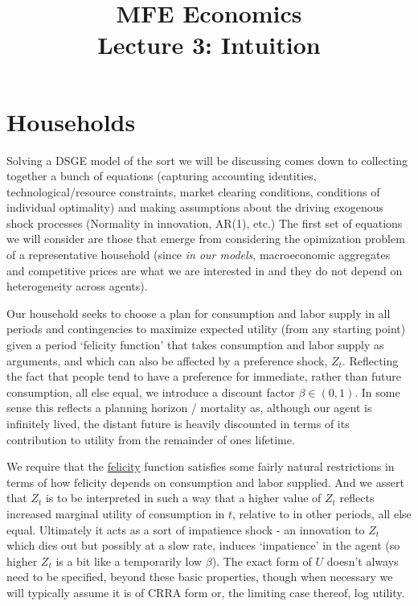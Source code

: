 \documentclass[authoryear,11pt]{elsarticle}
\begin{document}
\begin{frontmatter}
\title{MFE Economics\\Lecture 3: Intuition}
\end{frontmatter}


\section{Households}
Solving a DSGE model of the sort we will be discussing comes down to collecting together a bunch of equations (capturing accounting identities, technological/resource constraints, market clearing conditions, conditions of individual optimality) and making assumptions about the driving exogenous shock processes (Normality in innovation, AR(1), etc.) The first set of equations we will consider are those that emerge from considering the opimization problem of a representative household (since \textit{in our models}, macroeconomic aggregates and competitive prices are what we are interested in and they do not depend on heterogeneity across agents).

Our household seeks to choose a plan for consumption and labor supply in all periods and contingencies to maximize expected utility (from any starting point) given a period `felicity function' that takes consumption and labor supply as arguments, and which can also be affected by a preference shock, $Z_{t}$. Reflecting the fact that people tend to have a preference for immediate, rather than future consumption, all else equal, we introduce a discount factor $\beta \in (0,1)$. In some sense this reflects a planning horizon / mortality as, although our agent is infinitely lived, the distant future is heavily discounted in terms of its contribution to utility from the remainder of ones lifetime.

We require that the \href{https://dictionary.cambridge.org/dictionary/english/felicity}{felicity} function satisfies some fairly natural restrictions in terms of how felicity depends on consumption and labor supplied. And we assert that $Z_{t}$ is to be interpreted in such a way that a higher value of $Z_{t}$ reflects increased marginal utility of consumption in $t$, relative to in other periods, all else equal. Ultimately it acts as a sort of impatience shock - an innovation to $Z_{t}$ which dies out but possibly at a slow rate, induces `impatience' in the agent (so higher $Z_{t}$ is a bit like a temporarily low $\beta$). The exact form of $U$ doesn't always need to be specified, beyond these basic properties, though when necessary we will typically assume it is of CRRA form or, the limiting case thereof, log utility.
\end{document}
